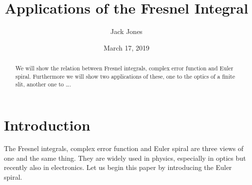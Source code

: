 \documentclass[12pt]{article}
\title{Applications of the Fresnel Integral}
\author{Jack Jones}
\date{March 17\th, 2019}
\begin{document}
\maketitle
\begin{abstract}
We will show the relation between Fresnel integrals, complex error function and Euler spiral.  Furthermore we will show two applications of these, one to the optics of a finite slit, another one to \dots.
\end{abstract}
\clearpage


\section{Introduction}
The Fresnel integrals, complex error function and Euler spiral are three views of one and the same thing.  They are widely used in physics, especially in optics but recently also in electronics.  Let us begin this paper by introducing the Euler spiral.
\end{document}
